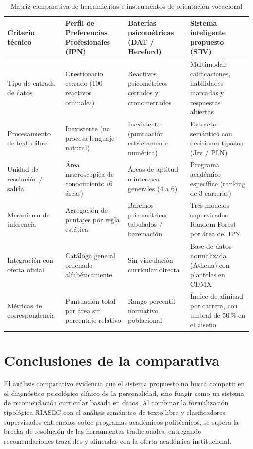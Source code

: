 \begin{table}[htbp]
\centering
\small
\renewcommand{\arraystretch}{1.2}
\caption{Matriz comparativa de herramientas e instrumentos de orientación vocacional}
\label{tab:comp-herramientas-vocacionales}
\begin{tabularx}{\textwidth}{L{0.22\textwidth}L{0.24\textwidth}L{0.24\textwidth}X}
\toprule
{} \color{white}\textbf{Criterio técnico} & \color{white}\textbf{Perfil de Preferencias Profesionales (IPN)} & \color{white}\textbf{Baterías psicométricas (DAT / Hereford)} & \color{white}\textbf{Sistema inteligente propuesto (SRV)} \\
\midrule
Tipo de entrada de datos & Cuestionario cerrado (100 reactivos ordinales) & Reactivos psicométricos cerrados y cronometrados & Multimodal: calificaciones, habilidades marcadas y respuestas abiertas \\
Procesamiento de texto libre & Inexistente (no procesa lenguaje natural) & Inexistente (puntuación estrictamente numérica) & Extractor semántico con decisiones tipadas (Jev / PLN) \\
Unidad de resolución / salida & Área macroscópica de conocimiento (6 áreas) & Áreas de aptitud o intereses generales (4 a 6) & Programa académico específico (ranking de 3 carreras) \\
Mecanismo de inferencia & Agregación de puntajes por regla estática & Baremos psicométricos tabulados / baremación & Tres modelos supervisados Random Forest por área del IPN \\
Integración con oferta oficial & Catálogo general ordenado alfabéticamente & Sin vinculación curricular directa & Base de datos normalizada (Athena) con planteles en CDMX \\
Métricas de correspondencia & Puntuación total por área sin porcentaje relativo & Rango percentil normativo poblacional & Índice de afinidad por carrera, con umbral de 50\,\% en el diseño \\
\bottomrule
\end{tabularx}
\end{table}



\section{Conclusiones de la comparativa}
El análisis comparativo evidencia que el sistema propuesto no busca competir en el diagnóstico psicológico clínico de la personalidad, sino fungir como un sistema de recomendación curricular basado en datos. Al combinar la formalización tipológica RIASEC con el análisis semántico de texto libre y clasificadores supervisados entrenados sobre programas académicos politécnicos, se supera la brecha de resolución de las herramientas tradicionales, entregando recomendaciones trazables y alineadas con la oferta académica institucional.

\endinput
